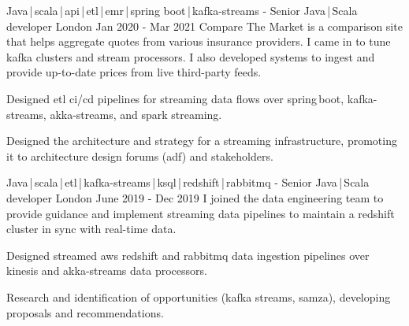 \begin{cventries}
    \cventry
    {Java\,|\,scala\,|\,api\,|\,etl\,|\,emr\,|\,spring boot\,|\,kafka-streams}
    { - Senior Java\,|\,Scala developer}
    {London}
    {Jan 2020 - Mar 2021}
    {Compare The Market is a comparison site that helps aggregate quotes from various insurance providers. I came in to tune kafka clusters and stream processors. I also developed systems to ingest and provide up-to-date prices from live third-party feeds.}
    {
        \begin{cvitems}
            \item{Designed etl ci/cd pipelines for streaming data flows over spring\,boot, kafka-streams, akka-streams, and spark streaming.}
            \item{Designed the architecture and strategy for a streaming infrastructure, promoting it to architecture design forums (adf) and stakeholders.}
        \end{cvitems}
    }

    \cventry
    {Java\,|\,scala\,|\,etl\,|\,kafka-streams\,|\,ksql\,|\,redshift\,|\,rabbitmq}
    { - Senior Java\,|\,Scala developer}
    {London}
    {June 2019 - Dec 2019}
    {I joined the data engineering team to provide guidance and implement streaming data pipelines to maintain a redshift cluster in sync with real-time data.}
    {
        \begin{cvitems}
            \item{Designed streamed aws redshift and rabbitmq data ingestion pipelines over kinesis and akka-streams data processors. }
            \item{Research and identification of opportunities (kafka streams, samza), developing proposals and recommendations.}
        \end{cvitems}
    }


\end{cventries}
